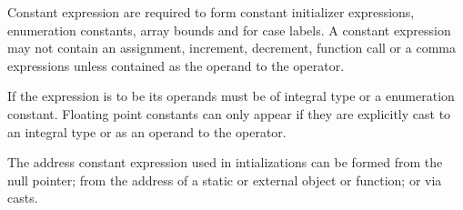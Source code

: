 \begin{production}
\end{production}


Constant expression are required to form constant initializer
expressions, enumeration constants, array bounds and for case labels.
A constant expression may not contain an assignment, increment,
decrement, function call or a comma expressions unless contained as the
operand to the  operator.

If the expression is to be  its operands must be of
integral type or a enumeration constant. Floating point constants can
only appear if they are explicitly cast to an integral type or as an
operand to the  operator.

The address constant expression used in intializations can be formed
from the null pointer; from the address of a static or external object
or function; or via casts.

